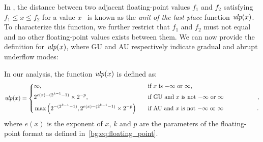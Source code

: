 In \soap{}, the distance between two adjacent floating-point values $f_1$ and
$f_2$ satisfying $f_1 \leq x \leq f_2$ for a value $x$~\cite{goldberg} is known
as the \emph{unit of the last place} function $\operatorname{\mathit{ulp}}(x)$.  To characterize
this function, we further restrict that $f_1$ and $f_2$ must not equal and
no other floating-point values exists between them.  We can now provide the
definition for $\operatorname{\mathit{ulp}}(x)$, where GU and AU respectively indicate gradual and
abrupt underflow modes:
\begin{definition}
    In our analysis, the function $\operatorname{\mathit{ulp}}(x)$ is defined as:
    \begin{equation}
        \ulp(x) = \left\{
            \begin{aligned}
                & \infty,  && \text{if $x$ is $-\infty$ or $\infty$}, \\
                & 2^{e(x) - (2^{k - 1} - 1)} \times 2^{-p},
                \quad && \text{%
                    if GU and $x$ is not $-\infty$ or $\infty$
                }, \\
                & \max\left(
                    2^{-(2^{k-1} - 1)},
                    2^{e(x) - (2^{k - 1} - 1)} \times 2^{-p}
                \right) \quad && \text{%
                    if AU and $x$ is not $-\infty$ or $\infty$
                }.
            \end{aligned}
        \right.
    \end{equation}
    where $e(x)$ is the exponent of $x$, $k$ and $p$ are the parameters of the
    floating-point format as defined in~\eqref{bg:eq:floating_point}.
    {}\label{so:def:ulp}
\end{definition}

